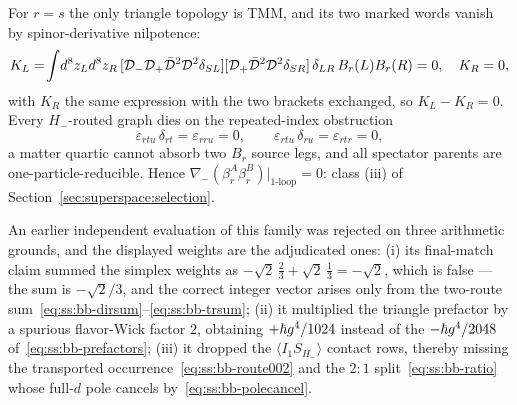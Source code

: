 \begin{remark}%
\label{rem:ss:bbdiagonal}
For $r=s$ the only triangle topology is TMM, and its two marked words vanish
by spinor-derivative nilpotence:
\begin{equation}\label{eq:ss:bb-diagzero}
K_L=\!\int\! d^{8}z_Ld^{8}z_R\,
[\mathcal{D}_-\mathcal{D}_+\bar{\mathcal{D}}^{2}\mathcal{D}^{2}\delta_{SL}][\mathcal{D}_+\bar{\mathcal{D}}^{2}\mathcal{D}^{2}\delta_{SR}]\,
\delta_{LR}\,B_r(L)B_r(R)=0,
\quad
K_R=0,
\end{equation}
with $K_R$ the same expression with the two brackets exchanged, so
$K_L-K_R=0$. Every $H_-$-routed graph dies on the repeated-index obstruction
\begin{equation}\label{eq:ss:bb-repeatedindex}
\varepsilon_{rtu}\,\delta_{rt}=\varepsilon_{rru}=0,
\qquad
\varepsilon_{rtu}\,\delta_{ru}=\varepsilon_{rtr}=0,
\end{equation}
a matter quartic cannot absorb two $B_r$ source legs, and all spectator
parents are one-particle-reducible. Hence
$\nabla_-(\beta_r^{A}\beta_r^{B})|_{\mathrm{1\text{-}loop}}=0$: class (iii) of
Section~\ref{sec:superspace:selection}.
\end{remark}

\begin{remark}\label{rem:ss:bbgate1}
An earlier independent evaluation of this family was rejected on three
arithmetic grounds, and the displayed weights are the adjudicated ones:
(i) its final-match claim summed the simplex weights as
$-\sqrt2\,\tfrac23+\sqrt2\,\tfrac13=-\sqrt2$, which is false --- the sum is
$-\sqrt2/3$, and the correct integer vector arises only from the two-route
sum~\eqref{eq:ss:bb-dirsum}--\eqref{eq:ss:bb-trsum}; (ii) it multiplied the
triangle prefactor by a spurious flavor-Wick factor $2$, obtaining
$+\hbar g^{4}/1024$ instead of the $-\hbar g^{4}/2048$
of~\eqref{eq:ss:bb-prefactors}; (iii) it dropped the
$\langle I_1S_{H_-}\rangle$ contact rows, thereby missing the transported
occurrence~\eqref{eq:ss:bb-route002} and the $2:1$
split~\eqref{eq:ss:bb-ratio} whose full-$d$ pole cancels
by~\eqref{eq:ss:bb-polecancel}.
\end{remark}


